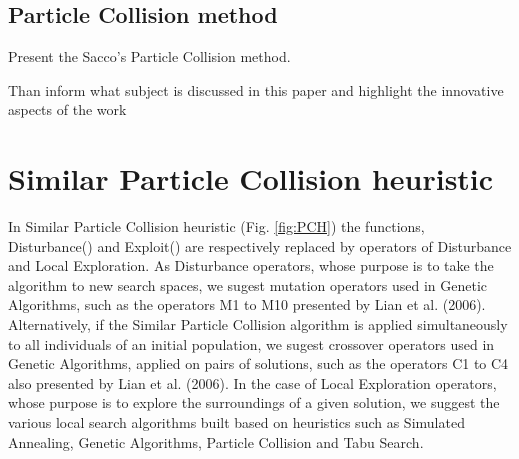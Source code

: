\subsection{Particle Collision method}
\label{sec:PC}

Present the Sacco's Particle Collision method.


Than inform what subject is discussed in this paper and highlight the innovative aspects of the work

\section{Similar Particle Collision heuristic}
\label{sec:SPC}

In Similar Particle Collision heuristic (Fig. \ref{fig:PCH}) the functions, Disturbance() and Exploit() are respectively replaced by operators of Disturbance and Local Exploration. As Disturbance operators, whose purpose is to take the algorithm to new search spaces, we sugest mutation operators used in Genetic Algorithms, such as the operators M1 to M10 presented by Lian et al. (2006). Alternatively, if the Similar Particle Collision algorithm is applied simultaneously to all individuals of an initial population, we sugest crossover operators used in Genetic Algorithms, applied on pairs of solutions, such as the operators C1 to C4 also presented by Lian et al. (2006). In the case of Local Exploration operators, whose purpose is to explore the surroundings of a given solution, we suggest the various local search algorithms built based on heuristics such as Simulated Annealing, Genetic Algorithms, Particle Collision and Tabu Search. \\

